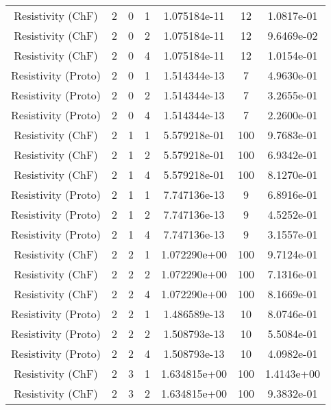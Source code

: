 \documentclass{article}
\begin{document}
\begin{small} 
  \begin{table} 
    \begin{center}
      \begin{tabular}{|c|c|c|c|c|c||c|} \hline 
        \hline 
        Resistivity      (ChF) & 2 & 0 & 1& 1.075184e-11 & 12 & 1.0817e-01\\
        Resistivity      (ChF) & 2 & 0 & 2& 1.075184e-11 & 12 & 9.6469e-02\\
        Resistivity      (ChF) & 2 & 0 & 4& 1.075184e-11 & 12 & 1.0154e-01\\
        Resistivity    (Proto) & 2 & 0 & 1& 1.514344e-13 & 7 & 4.9630e-01\\
        Resistivity    (Proto) & 2 & 0 & 2& 1.514344e-13 & 7 & 3.2655e-01\\
        Resistivity    (Proto) & 2 & 0 & 4& 1.514344e-13 & 7 & 2.2600e-01\\
        \hline 
        Resistivity      (ChF) & 2 & 1 & 1& 5.579218e-01 & 100 & 9.7683e-01\\
        Resistivity      (ChF) & 2 & 1 & 2& 5.579218e-01 & 100 & 6.9342e-01\\
        Resistivity      (ChF) & 2 & 1 & 4& 5.579218e-01 & 100 & 8.1270e-01\\
        Resistivity    (Proto) & 2 & 1 & 1& 7.747136e-13 & 9 & 6.8916e-01\\
        Resistivity    (Proto) & 2 & 1 & 2& 7.747136e-13 & 9 & 4.5252e-01\\
        Resistivity    (Proto) & 2 & 1 & 4& 7.747136e-13 & 9 & 3.1557e-01\\
        \hline 
        Resistivity      (ChF) & 2 & 2 & 1& 1.072290e+00 & 100 & 9.7124e-01\\
        Resistivity      (ChF) & 2 & 2 & 2& 1.072290e+00 & 100 & 7.1316e-01\\
        Resistivity      (ChF) & 2 & 2 & 4& 1.072290e+00 & 100 & 8.1669e-01\\
        Resistivity    (Proto) & 2 & 2 & 1& 1.486589e-13 & 10 & 8.0746e-01\\
        Resistivity    (Proto) & 2 & 2 & 2& 1.508793e-13 & 10 & 5.5084e-01\\
        Resistivity    (Proto) & 2 & 2 & 4& 1.508793e-13 & 10 & 4.0982e-01\\
        \hline 
        Resistivity      (ChF) & 2 & 3 & 1& 1.634815e+00 & 100 & 1.4143e+00\\
        Resistivity      (ChF) & 2 & 3 & 2& 1.634815e+00 & 100 & 9.3832e-01\\

\end{tabular}
\end{center}
\end{table}
\end{small}
\end{document}
